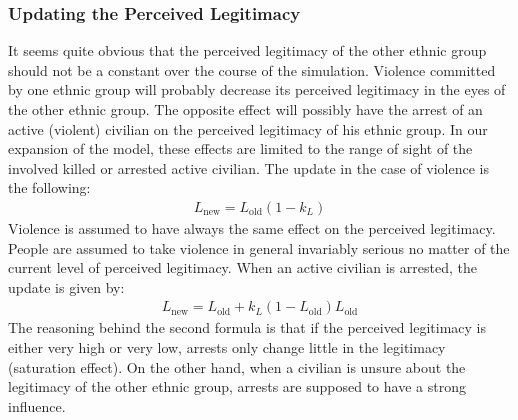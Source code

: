 \documentclass[11pt]{article}
\begin{document}
\subsubsection{Updating the Perceived Legitimacy}
It seems quite obvious that the perceived legitimacy of the other ethnic group should not be a constant over the course of the simulation. Violence committed by one ethnic group will probably decrease its perceived legitimacy in the eyes of the other ethnic group. The opposite effect will possibly have the arrest of an active (violent) civilian on the perceived legitimacy of his ethnic group. In our expansion of the model, these effects are limited to the range of sight of the involved killed or arrested active civilian. The update in the case of violence is the following:
\begin{align}
L_{\text{new}} = L_{\text{old}} \left( 1 - k_L \right)
\label{eqn:update_violence}
\end{align}
Violence is assumed to have always the same effect on the perceived legitimacy. People are assumed to take violence in general invariably serious no matter of the current level of perceived legitimacy. When an active civilian is arrested, the update is given by:
\begin{align}
L_{\text{new}} = L_{\text{old}} + k_L \left( 1 - L_{\text{old}} \right) L_{\text{old}}
\label{eqn:update_arrest}
\end{align}
The reasoning behind the second formula is that if the perceived legitimacy is either very high or very low, arrests only change little in the legitimacy (saturation effect). On the other hand, when a civilian is unsure about the legitimacy of the other ethnic group, arrests are supposed to have a strong influence.
\end{document}

